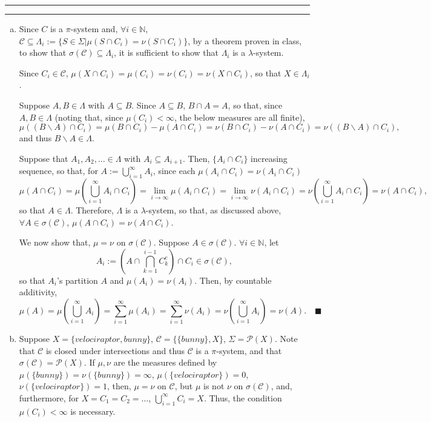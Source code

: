 \documentclass[11pt]{article}
\newcounter{questionCounter}
\newcounter{partCounter}[questionCounter]
\newenvironment{question}[2][\arabic{questionCounter}]{%
    \setcounter{partCounter}{0}%
    \vspace{.25in} \hrule \vspace{0.5em}%
        \noindent{\bf #2}%
    \vspace{0.8em} \hrule \vspace{.10in}%
    \addtocounter{questionCounter}{1}%
}{}
\newcommand{\mqed}{\quad \blacksquare}
\newcommand{\sminus}{\backslash}
\newcommand{\N}{\mathbb{N}} %
\newcommand{\pow}[1]{\mathcal{P}\left(#1\right)} %
\begin{document}
\begin{question}{Problem 3}
\begin{enumerate}[(a)]
\item Since $C$ is a $\pi$-system and, $\forall i \in \N$,
$\mathcal{C} \subseteq \Lambda_i
 := \{S \in \Sigma | \mu(S \cap C_i) = \nu(S \cap C_i)\}$, by a theorem proven
in class, to show that $\sigma(\mathcal{C}) \subseteq \Lambda_i$, it is
sufficient to show that $\Lambda_i$ is a $\lambda$-system.

Since $C_i \in \mathcal{C}$,
$\mu(X \cap C_i) = \mu(C_i) = \nu(C_i) = \nu(X \cap C_i)$, so that
$X \in \Lambda_i$.

Suppose $A,B \in \Lambda$ with $A \subseteq B$. Since $A \subseteq B$,
$B \cap A = A$, so that, since $A,B \in \Lambda$ (noting that, since
$\mu(C_i) < \infty$, the below measures are all finite),
\[\mu( (B \sminus A) \cap C_i)
 = \mu(B \cap C_i) - \mu(A \cap C_i)
 = \nu(B \cap C_i) - \nu(A \cap C_i)
 = \nu( (B \sminus A) \cap C_i),\]
and thus $B \sminus A \in \Lambda$.

Suppose that $A_1,A_2,\ldots \in \Lambda$ with $A_i \subseteq A_{i + 1}$.
Then, $\{A_i \cap C_i\}$ increasing sequence, so that, for
$A := \bigcup_{i = 1}^{\infty} A_i$, since each
$\mu(A_i \cap C_i) = \nu(A_i \cap C_i)$
\[\mu(A \cap C_i)
 = \mu\left( \bigcup_{i = 1}^{\infty}A_i \cap C_i \right)
 = \lim_{i \rightarrow \infty} \mu(A_i \cap C_i)
 = \lim_{i \rightarrow \infty} \nu(A_i \cap C_i)
 = \nu\left( \bigcup_{i = 1}^{\infty}A_i \cap C_i \right)
 = \nu(A \cap C_i),
\]
so that $A \in \Lambda$. Therefore, $\Lambda$ is a $\lambda$-system, so that,
as discussed above, $\forall A \in \sigma(\mathcal{C})$,
$\mu(A \cap C_i) = \nu(A \cap C_i)$.

We now show that, $\mu = \nu$ on $\sigma(\mathcal{C})$. Suppose
$A \in \sigma(\mathcal{C})$. $\forall i \in \N$, let
\[A_i
 := \left( A \cap \bigcap_{k = 1}^{i - 1} C_k^c \right) \cap C_i
 \in \sigma(\mathcal{C}),\] so that $A_i$'s partition $A$ and
$\mu(A_i) = \nu(A_i)$. Then, by countable additivity,
\[\mu(A)
 = \mu\left( \bigcup_{i = 1}^{\infty} A_i \right)
 = \sum_{i = 1}^{\infty} \mu(A_i)
 = \sum_{i = 1}^{\infty} \nu(A_i)
 = \nu\left( \bigcup_{i = 1}^{\infty} A_i \right)
 = \nu(A). \mqed
\]

\item Suppose $X = \{velociraptor,bunny\}$, $\mathcal{C} = \{\{bunny\},X\}$,
$\Sigma = \pow{X}$. Note that $\mathcal{C}$ is closed under intersections and
thus $\mathcal{C}$ is a $\pi$-system, and that
$\sigma(\mathcal{C}) = \pow{X}$. If $\mu,\nu$ are the measures defined by
$\mu(\{bunny\}) = \nu(\{bunny\}) = \infty$, $\mu(\{velociraptor\}) = 0$,
$\nu(\{velociraptor\}) = 1$, then, $\mu = \nu$ on $\mathcal{C}$, but $\mu$ is
not $\nu$ on $\sigma(\mathcal{C})$, and, furthermore, for
$X = C_1 = C_2 = \ldots$, $\bigcup_{i = 1}^{\infty} C_i = X$. Thus, the
condition $\mu(C_i) < \infty$ is necessary.
\end{enumerate}
\end{question}
\end{document}

